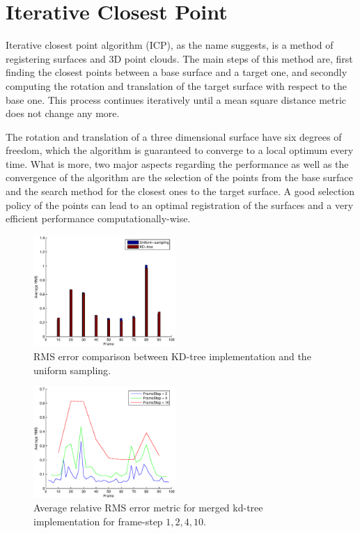 \section{Iterative Closest Point}
\label{icp}

Iterative closest point algorithm (ICP), as the name suggests, is a method of registering surfaces and 3D point clouds. The main steps of this method are, first finding the closest points between a base surface and a target one, and secondly computing the rotation and translation of the target surface with respect to the base one. This process continues iteratively until a mean square distance metric does not change any more.

The rotation and translation of a three dimensional surface have six degrees of freedom, which the algorithm is guaranteed to converge to a local optimum every time. What is more, two major aspects regarding the performance as well as the convergence of the algorithm are the selection of the points from the base surface and the search method for the closest ones to the target surface. A good selection policy of the points can lead to an optimal registration of the surfaces and a very efficient performance computationally-wise.

\begin{figure}[bt!]
  \centering
    \includegraphics[width=0.48\textwidth]{figures/comparison.eps}
    \caption{RMS error comparison between KD-tree implementation and the uniform sampling.}
    \label{fig:comparison}
\end{figure}

\begin{figure}[t!]
  \centering
    \includegraphics[width=0.48\textwidth]{figures/RMSmergedKD.eps}
    \caption{Average relative RMS error metric for merged kd-tree implementation for frame-step $1,2,4,10$.}
    \label{fig:rmsmergederror}
\end{figure}

